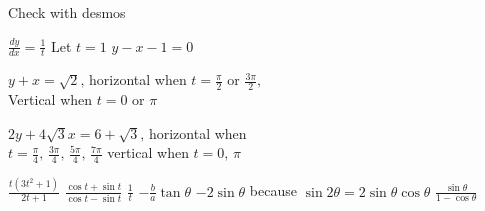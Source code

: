 \begin{Answer}[ref={exParametric}]
\Question Check with desmos%

\Question %
\begin{tasks}
	\task $\frac{d y}{d x} =\frac{1}{t}$
	\task  Let $t =1$
	\task $y -x-1 =0$
\end{tasks}

\Question %
$y +x =\sqrt{2}\text{,}$ horizontal when $t =\frac{\pi }{2}$ or $\frac{3 \pi }{2}\text{,}$ \\Vertical when $t =0$ or $\pi $ 

\Question %
$2 y +4 \sqrt{3} x =6 +\sqrt{3}\text{,}$ horizontal when \\
$t =\frac{\pi }{4}\text{,}$ $\frac{3 \pi }{4}\text{,}$
 $\frac{5 \pi }{4}\text{,}$ $\frac{7 \pi }{4}$ vertical when $t =0\text{,}$ $\pi $

\Question %
\begin{tasks}
	\task $\frac{t \left (3 t^{2} +1\right )}{2 t +1}$ 
	\task $\frac{\cos  t +\sin  t}{\cos  t -\sin  t}$
	\task $\frac{1}{t}$ 
	\task $ -\frac{b}{a} \tan  \theta $ 
	\task $ -2 \sin  \theta $ because $\sin  2 \theta  =2 \sin  \theta  \cos  \theta $ 
	\task $\frac{\sin  \theta }{1 -\cos  \theta }$ 
\end{tasks}	
\end{Answer}%

